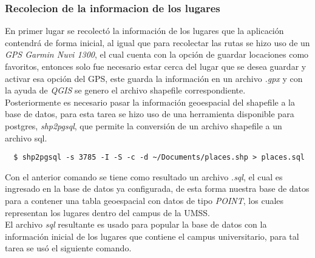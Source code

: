 \subsubsection{Recolecion de la informacion de los lugares}

En primer lugar se recolectó la información de los lugares que la aplicación contendrá  de forma inicial, al igual que para recolectar las rutas se hizo uso de un \emph{GPS Garmin Nuvi 1300}, el cual cuenta con la opción de guardar locaciones como favoritos, entonces solo fue necesario estar cerca del lugar que se desea guardar y activar esa opción del GPS, este guarda la información en un archivo \emph{.gpx} y con la ayuda de \emph{QGIS} se genero el archivo shapefile correspondiente.\\

Posteriormente es necesario pasar la información geoespacial del shapefile a la base de datos, para esta tarea se hizo uso de una herramienta disponible para postgres, \emph{shp2pgsql}, que permite la conversión de un archivo shapefile a un archivo sql.

\begin{verbatim}
  $ shp2pgsql -s 3785 -I -S -c -d ~/Documents/places.shp > places.sql
\end{verbatim}

Con el anterior comando se tiene como resultado un archivo \emph{.sql}, el cual es ingresado en la base de datos ya configurada, de esta forma nuestra base de datos para a contener una tabla geoespacial con datos de tipo \emph{POINT}, los cuales representan los lugares dentro del campus de la UMSS.\\

%

El archivo \emph{sql} resultante es usado para popular la base de datos con la información inicial de los lugares que contiene el campus universitario, para tal tarea se usó el siguiente comando.\\

